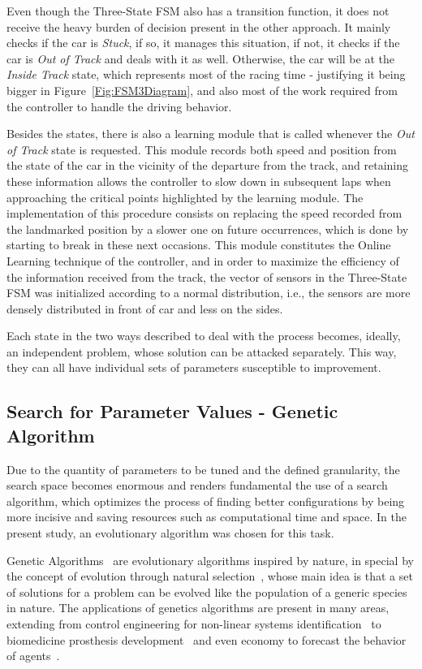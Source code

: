 	Even though the Three-State FSM also has a transition function, it does not receive the heavy burden of decision present in the other approach. It mainly checks if the car is \emph{Stuck}, if so, it manages this situation, if not, it checks if the car is \emph{Out of Track} and deals with it as well. Otherwise, the car will be at the \emph{Inside Track} state, which represents most of the racing time - justifying it being bigger in Figure~\ref{Fig:FSM3Diagram}, and also most of the work required from the controller to handle the driving behavior.
	
	Besides the states, there is also a learning module that is called whenever the \emph{Out of Track} state is requested. This module records both speed and position from the state of the car in the vicinity of the departure from the track, and retaining these information allows the controller to slow down in subsequent laps when approaching the critical points highlighted by the learning module. The implementation of this procedure consists on replacing the speed recorded from the landmarked position by a slower one on future occurrences, which is done by starting to break in these next occasions. This module constitutes the Online Learning technique of the controller, and in order to maximize the efficiency of the information received from the track, the vector of sensors in the Three-State FSM was initialized according to a normal distribution, i.e., the sensors are more densely distributed in front of car and less on the sides.
	
	Each state in the two ways described to deal with the process becomes, ideally, an independent problem, whose solution can be attacked separately. This way, they can all have individual sets of parameters susceptible to improvement.
	
\subsection{Search for Parameter Values - Genetic Algorithm} \label{subsec:GA}
	
	Due to the quantity of parameters to be tuned and the defined granularity, the search space becomes enormous and renders fundamental the use of a search algorithm, which optimizes the process of finding better configurations by being more incisive and saving resources such as computational time and space. In the present study, an evolutionary algorithm was chosen for this task.
	
	Genetic Algorithms~\cite{GA} are evolutionary algorithms inspired by nature, in special by the concept of evolution through natural selection~\cite{Darwin}, whose main idea is that a set of solutions for a problem can be evolved like the population of a generic species in nature. The applications of genetics algorithms are present in many areas, extending from control engineering for non-linear systems identification~\cite{GACTRL} to biomedicine prosthesis development~\cite{GABIO} and even economy to forecast the behavior of agents~\cite{GAECO}.
	
